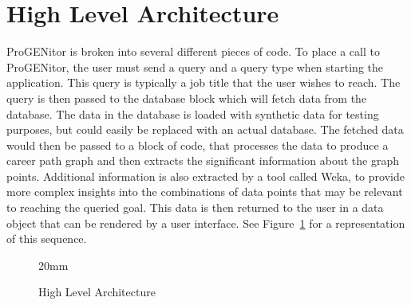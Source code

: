 \section{High Level Architecture}
\label{sect:high-level-architecture}
ProGENitor is broken into several different pieces of code.  To place a call
to ProGENitor, the user must send a query and a query type when starting the
application.  This query is typically a job title that the user wishes to reach.
The query is then passed to the database block which will fetch data from the
database.  The data in the database is loaded with synthetic data for testing
purposes, but could easily be replaced with an actual database. The fetched data
would then be passed to a block of code, that processes the data to produce a
career path graph and then extracts the significant information about the graph
points.  Additional information is also extracted by a tool called Weka, to
provide more complex insights into the combinations of data points that may be
relevant to reaching the queried goal.  This data is then returned to the user
in a data object that can be rendered by a user interface.  See
Figure~\ref{fig:HighLevelProjectArchitecture} for a representation of this sequence.

\usetikzlibrary{shapes,arrows,chains}

\begin{figure}[H]
	\centering
  	\resizebox {!} {20mm} {
}

	\caption{High Level Architecture}
	\label{fig:HighLevelProjectArchitecture}
\end{figure}

